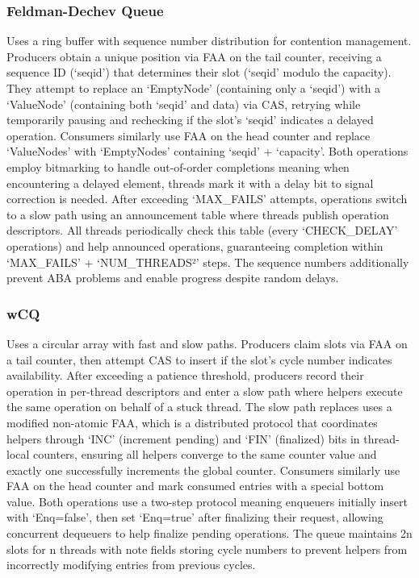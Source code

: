 \subsubsection{Feldman-Dechev Queue} 
Uses a ring buffer with sequence number distribution for contention management. Producers obtain a unique position via \ac{FAA} on the tail counter, receiving a sequence ID (\enquote*{seqid}) that determines their slot (\enquote*{seqid} modulo the capacity). They attempt to replace an \enquote*{EmptyNode} (containing only a \enquote*{seqid}) with a \enquote*{ValueNode} (containing both \enquote*{seqid} and data) via \ac{CAS}, retrying while temporarily pausing and rechecking if the slot's \enquote*{seqid} indicates a delayed operation. Consumers similarly use \ac{FAA} on the head counter and replace \enquote*{ValueNodes} with \enquote*{EmptyNodes} containing \enquote*{seqid} + \enquote*{capacity}. Both operations employ bitmarking to handle out-of-order completions meaning when encountering a delayed element, threads mark it with a delay bit to signal correction is needed. After exceeding \enquote*{MAX\_FAILS} attempts, operations switch to a slow path using an announcement table where threads publish operation descriptors. All threads periodically check this table (every \enquote*{CHECK\_DELAY} operations) and help announced operations, guaranteeing completion within \enquote*{MAX\_FAILS} + \enquote*{NUM\_THREADS²} steps. The sequence numbers additionally prevent ABA problems and enable progress despite random delays. \cite{FeldmanDechev2015WaitFreeRingBuffer,FeldmanDechevV2,FeldmanDechevV3}

\subsubsection{wCQ} 
Uses a circular array with fast and slow paths. Producers claim slots via \ac{FAA} on a tail counter, then attempt \ac{CAS} to insert if the slot's cycle number indicates availability. After exceeding a patience threshold, producers record their operation in per-thread descriptors and enter a slow path where helpers execute the same operation on behalf of a stuck thread. The slow path replaces uses a modified non-atomic \ac{FAA}, which is a distributed protocol that coordinates helpers through \enquote*{INC} (increment pending) and \enquote*{FIN} (finalized) bits in thread-local counters, ensuring all helpers converge to the same counter value and exactly one successfully increments the global counter. Consumers similarly use \ac{FAA} on the head counter and mark consumed entries with a special bottom value. Both operations use a two-step protocol meaning enqueuers initially insert with \enquote*{Enq=false}, then set \enquote*{Enq=true} after finalizing their request, allowing concurrent dequeuers to help finalize pending operations. The queue maintains 2n slots for n threads with note fields storing cycle numbers to prevent helpers from incorrectly modifying entries from previous cycles. \cite{wCQWaitFreeQueue}

